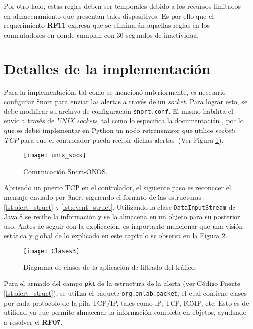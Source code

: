Por otro lado, estas reglas deben ser temporales debido a los recursos limitados
en almacenamiento que presentan tales dispositivos. Es por ello que el
requerimiento \textbf{RF11} expresa que se eliminarán aquellas reglas en
los conmutadores en donde cumplan con 30 segundos de inactividad.

\section {Detalles de la implementación}

Para la implementación, tal como se mencionó anteriormente, es necesario
configurar Snort para enviar las alertas a través de un \textit{socket}. Para
lograr esto, se debe modificar su archivo de configuración \verb|snort.conf|. El
mismo habilita el envío a través de \textit{UNIX sockets}, tal como lo
especifica la documentación \parencite{snort_manual}, por lo que se debió
implementar en Python un nodo retransmisor que utilice \textit{sockets TCP} para
que el controlador pueda recibir dichas alertas. (Ver Figura
\ref{fig:bloques_relay}).

\begin{figure}[htbp]
	\centering 
	\texttt{[image: unix\_sock]}
	\caption{Comunicación Snort-ONOS.}
	\label{fig:bloques_relay}
\end{figure}

Abriendo un puerto TCP en el controlador, el siguiente paso es reconocer el
mensaje enviado por Snort siguiendo el formato de las estructuras
\ref{lst:alert_struct} y \ref{lst:event_struct}. Utilizando la clase
\verb|DataInputStream| de Java 8 se recibe la información y se la almacena en un
objeto para su posterior uso. Antes de seguir con la explicación, es importante
mencionar que una visión estática y global de lo explicado en este capítulo se
observa en la Figura \ref{fig:diagrama_de_clases_2}.

\begin{figure}[th]
	\centering 
	\texttt{[image: Clases3]}
	\caption{Diagrama de clases de la aplicación de filtrado del tráfico.}
	\label{fig:diagrama_de_clases_2}
\end{figure}

Para el armado del campo \verb|pkt| de la estructura de la alerta (ver Código Fuente
\ref{lst:alert_struct}), se utiliza el paquete \verb|org.onlab.packet|, el cual
contiene clases por cada protocolo de la pila TCP/IP, tales como IP, TCP, ICMP,
etc. Esto es de utilidad ya que permite almacenar la información completa en
objetos, ayudando a resolver el \textbf{RF07}.

